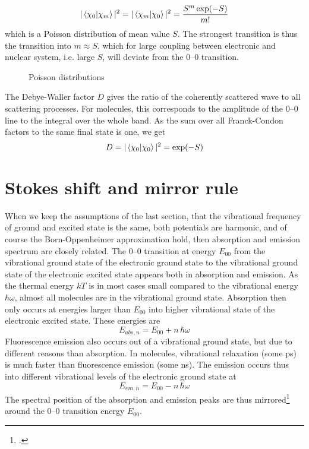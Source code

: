 \begin{equation}
 | \braket{ \chi_0 | \chi_m } | ^2  =  | \braket{ \chi_m | \chi_0 } | ^2 = \frac{S^m \exp(-S)}{m!}
\end{equation}
which is a Poisson distribution of mean value $S$.  The strongest transition is thus the transition into $m \approx S$, which for large coupling between electronic and nuclear system, i.e. large $S$, will deviate from the 0--0 transition.

\begin{figure}
   
  \caption{Poisson distributions}
\end{figure}

The Debye-Waller factor $D$ gives the ratio of the coherently scattered wave to all scattering processes. For molecules, this corresponds to the amplitude of the 0--0 line to the integral over the whole band. As the sum over all Franck-Condon factors to the same final state is one, we get
\begin{equation}
 D =  | \braket{ \chi_0 | \chi_0 } | ^2 = \exp(-S)
\end{equation}


\section{Stokes shift and mirror rule}


When we keep the assumptions of the last section, that the vibrational frequency of ground and excited state is the same, both potentials are harmonic, and of course the Born-Oppenheimer approximation hold, then absorption and emission spectrum are closely related. The 0--0 transition at energy $E_{00}$ from the vibrational ground state of the electronic ground state to the vibrational ground state of the electronic excited state appears both in absorption and emission. As the thermal energy $kT$ is in most cases small compared to the vibrational energy $\hbar \omega$, almost all molecules are in the vibrational ground state. Absorption then only occurs at energies larger than $E_{00}$ into higher vibrational state of the electronic excited state. These energies are
\begin{equation}
  E_{abs, n} = E_{00} + n \, \hbar \omega
\end{equation}
Fluorescence emission also occurs out of a vibrational ground state, but due to different reasons than absorption. In molecules, vibrational relaxation  (some ps) is much faster than fluorescence emission (some ns). The emission occurs thus into different vibrational levels of the electronic ground state at
\begin{equation}
  E_{em, n} = E_{00} - n \, \hbar \omega
\end{equation}
The spectral position of the absorption and emission peaks are thus mirrored\footcite[chapter 1.3.2 and 1.3.3]{Lakowicz2010} around the 0--0 transition  energy $E_{00}$.

